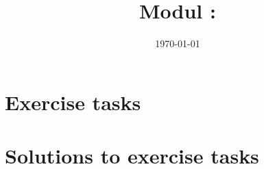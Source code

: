 \documentclass[twoside, a4paper]{article}
\title{Modul \GetItDigitalModulnumber: \GetItDigitalModulname}
\author{}
\institute{GET it digital}
\date{\today}
\begin{document}

{\setlength{\parskip}{0.05ex}    %
	\tableofcontents
	\newpage
}

\printnomenclature
\cleardoublepage

\pagestyle{fancyplain}
\setheadkapitel

\cleardoublepage




\cleardoublepage
\appendix
\setheadanhang

\section{Exercise tasks}
\renewcommand{\Aufgabe}[1]{#1}
\renewcommand{\Loesung}[1]{}


\section{Solutions to exercise tasks}
\renewcommand{\Aufgabe}[1]{}
\renewcommand{\Loesung}[1]{#1}


\clearpage
{}
\printbibliography

\clearpage
{}
\printindex
\end{document}

